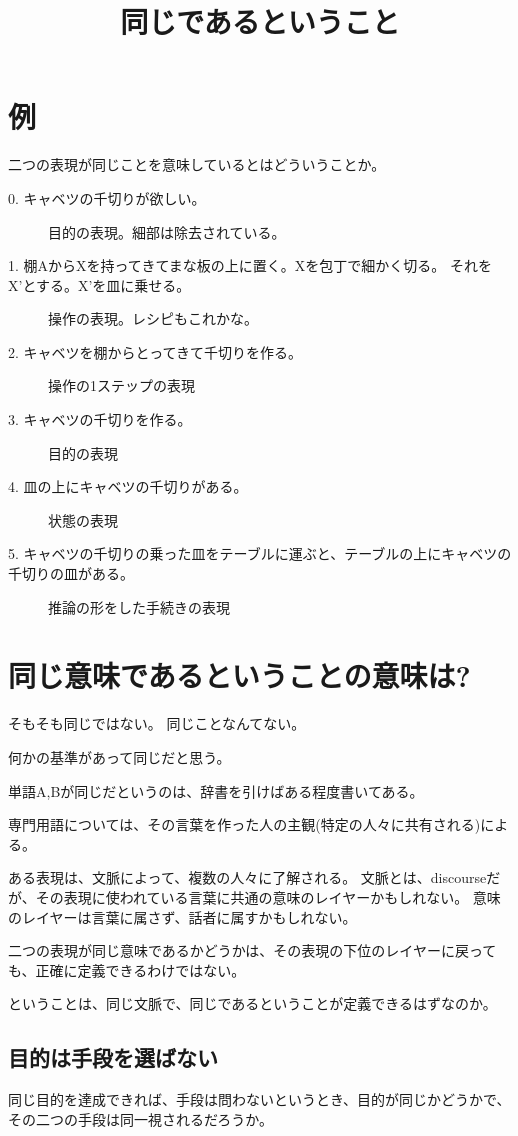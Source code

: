 \documentclass[10pt, oneside]{jarticle}   	%
\title{同じであるということ}
\author{\myname}
\begin{document}
\maketitle

\section{例}
二つの表現が同じことを意味しているとはどういうことか。

\begin{description}
\item[ 0. キャベツの千切りが欲しい。]
目的の表現。細部は除去されている。
\item[ 1. 棚AからXを持ってきてまな板の上に置く。Xを包丁で細かく切る。
それをX'とする。X'を皿に乗せる。] 
操作の表現。レシピもこれかな。
\item[ 2. キャベツを棚からとってきて千切りを作る。] 
操作の1ステップの表現
\item[ 3. キャベツの千切りを作る。] 
目的の表現
\item[ 4. 皿の上にキャベツの千切りがある。] 
状態の表現
\item[ 5. キャベツの千切りの乗った皿をテーブルに運ぶと、テーブルの上にキャベツの千切りの皿がある。] 
推論の形をした手続きの表現
\end{description}

\section{同じ意味であるということの意味は?}
そもそも同じではない。
同じことなんてない。

何かの基準があって同じだと思う。

単語A,Bが同じだというのは、辞書を引けばある程度書いてある。

専門用語については、その言葉を作った人の主観(特定の人々に共有される)による。

ある表現は、文脈によって、複数の人々に了解される。
文脈とは、discourseだが、その表現に使われている言葉に共通の意味のレイヤーかもしれない。
意味のレイヤーは言葉に属さず、話者に属すかもしれない。


二つの表現が同じ意味であるかどうかは、その表現の下位のレイヤーに戻っても、正確に定義できるわけではない。

ということは、同じ文脈で、同じであるということが定義できるはずなのか。


\subsection{目的は手段を選ばない}
同じ目的を達成できれば、手段は問わないというとき、目的が同じかどうかで、その二つの手段は同一視されるだろうか。
\end{document}
